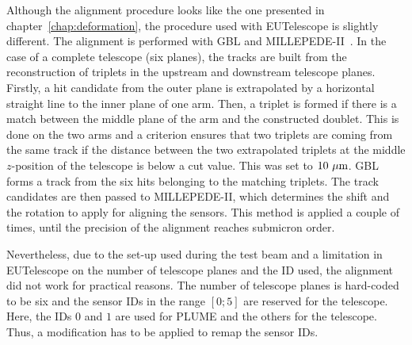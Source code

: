     Although the alignment procedure looks like the one presented in chapter~\ref{chap:deformation}, the procedure used with EUTelescope is slightly different.
    The alignment is performed with \gls{GBL} and MILLEPEDE-II~\cite{MPII}.
    In the case of a complete telescope (six planes), the tracks are built from the reconstruction of triplets in the upstream and downstream telescope planes.
    Firstly, a hit candidate from the outer plane is extrapolated by a horizontal straight line to the inner plane of one arm.
    Then, a triplet is formed if there is a match between the middle plane of the arm and the constructed doublet.
    This is done on the two arms and a criterion ensures that two triplets are coming from the same track if the distance between the two extrapolated triplets at the middle $z$-position of the telescope is below a cut value.
    This was set to $10~\rm{\mu m}$.
    \gls{GBL} forms a track from the six hits belonging to the matching triplets.
    The track candidates are then passed to MILLEPEDE-II, which determines the shift and the rotation to apply for aligning the sensors.
    This method is applied a couple of times, until the precision of the alignment reaches submicron order.

    Nevertheless, due to the set-up used during the test beam and a limitation in EUTelescope on the number of telescope planes and the ID used, the alignment did not work for practical reasons.
    The number of telescope planes is hard-coded to be six and the sensor IDs in the range $[0; 5]$ are reserved for the telescope. 
    Here, the IDs $0$ and $1$ are used for \gls{PLUME} and the others for the telescope.
    Thus, a modification has to be applied to remap the sensor IDs. 
      

